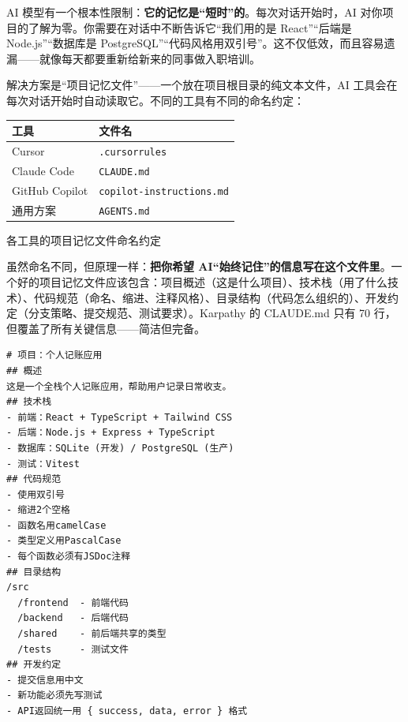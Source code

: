 


AI 模型有一个根本性限制：\textbf{它的记忆是“短时”的}。每次对话开始时，AI 对你项目的了解为零。你需要在对话中不断告诉它“我们用的是 React”“后端是 Node.js”“数据库是 PostgreSQL”“代码风格用双引号”。这不仅低效，而且容易遗漏——就像每天都要重新给新来的同事做入职培训。

解决方案是“项目记忆文件”——一个放在项目根目录的纯文本文件，AI 工具会在每次对话开始时自动读取它。不同的工具有不同的命名约定：

\begin{center}
\begin{tabularx}{\linewidth}{|X|X|}
\hline
\textbf{工具} & \textbf{文件名} \tabularnewline
\hline
Cursor & \texttt{.\allowbreak cursorrules} \tabularnewline
Claude Code & \texttt{CLAUDE.\allowbreak md} \tabularnewline
GitHub Copilot & \texttt{copilot-\allowbreak instructions.\allowbreak md} \tabularnewline
通用方案 & \texttt{AGENTS.\allowbreak md} \tabularnewline
\hline
\end{tabularx}
\end{center}

\begin{center}\small\color{gray}各工具的项目记忆文件命名约定\end{center}

虽然命名不同，但原理一样：\textbf{把你希望 AI“始终记住”的信息写在这个文件里}。一个好的项目记忆文件应该包含：项目概述（这是什么项目）、技术栈（用了什么技术）、代码规范（命名、缩进、注释风格）、目录结构（代码怎么组织的）、开发约定（分支策略、提交规范、测试要求）。Karpathy 的 CLAUDE.md 只有 70 行，但覆盖了所有关键信息——简洁但完备。

\begin{lstlisting}
# 项目：个人记账应用
## 概述
这是一个全栈个人记账应用，帮助用户记录日常收支。
## 技术栈
- 前端：React + TypeScript + Tailwind CSS
- 后端：Node.js + Express + TypeScript
- 数据库：SQLite (开发) / PostgreSQL (生产)
- 测试：Vitest
## 代码规范
- 使用双引号
- 缩进2个空格
- 函数名用camelCase
- 类型定义用PascalCase
- 每个函数必须有JSDoc注释
## 目录结构
/src
  /frontend  - 前端代码
  /backend   - 后端代码
  /shared    - 前后端共享的类型
  /tests     - 测试文件
## 开发约定
- 提交信息用中文
- 新功能必须先写测试
- API返回统一用 { success, data, error } 格式
\end{lstlisting}

